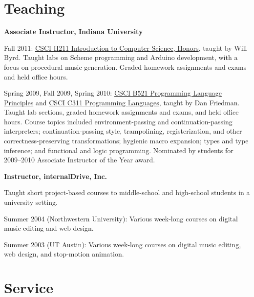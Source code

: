 \documentclass[10pt,letterpaper]{article}
\newenvironment{itemize*}
  {\begin{itemize}
      \setlength{\itemsep}{1pt}
      \setlength{\parskip}{3pt}
  }
  {\end{itemize}}
\begin{document}
\section*{Teaching}
\begin{itemize*}
\item{\textbf{Associate Instructor, Indiana University}}
\begin{itemize*}
\item Fall 2011: \href{http://www.cs.indiana.edu/cgi-pub/h211/}{CSCI
  H211 Introduction to Computer Science, Honors}, taught by Will Byrd.
  Taught labs on Scheme programming and Arduino development, with a
  focus on procedural music generation.  Graded homework assignments
  and exams and held office hours.

\item Spring 2009, Fall 2009, Spring 2010:
  \href{http://www.cs.indiana.edu/classes/b521}{CSCI B521 Programming
    Language Principles} and
  \href{http://www.cs.indiana.edu/classes/c311}{CSCI C311 Programming
    Languages}, taught by Dan Friedman.  Taught lab sections, graded
  homework assignments and exams, and held office hours.  Course
  topics included environment-passing and continuation-passing
  interpreters; continuation-passing style, trampolining,
  registerization, and other correctness-preserving transformations;
  hygienic macro expansion; types and type inference; and functional
  and logic programming.  Nominated by students for 2009--2010
  Associate Instructor of the Year award.

\end{itemize*}
\item{\textbf{Instructor, internalDrive, Inc.}}

  Taught short project-based courses to middle-school and high-school
  students in a university setting.
\begin{itemize*}
\item Summer 2004 (Northwestern University): Various week-long courses
  on digital music editing and web design.

\item Summer 2003 (UT Austin): Various week-long courses on digital
  music editing, web design, and stop-motion animation.
\end{itemize*}
\end{itemize*}

\section*{Service}
\end{document}
